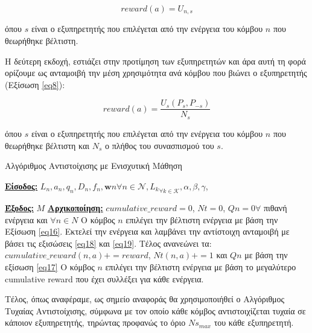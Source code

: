 \begin{equation}
    reward(a) = U_{n,s}
    \label{eq18}
\end{equation}

\noindent
όπου $s$ είναι ο εξυπηρετητής που επιλέγεται από την ενέργεια του κόμβου $n$ που θεωρήθηκε βέλτιστη.

Η δεύτερη εκδοχή, εστιάζει στην προτίμηση των εξυπηρετητών και άρα αυτή τη φορά ορίζουμε ως ανταμοιβή την μέση χρησιμότητα ανά κόμβου που βιώνει ο εξυπηρετητής (Εξίσωση \ref{eq8}):

\begin{equation}
    reward(a) = \frac{U_s(P_s,P_{-s})}{N_s}
    \label{eq19}
\end{equation}

\noindent
όπου $s$ είναι ο εξυπηρετητής που επιλέγεται από την ενέργεια του κόμβου $n$ που θεωρήθηκε βέλτιστη και $N_s$ ο πλήθος του συνασπισμού του $s$.

\newpage

\begin{algorithm}[h]
\caption{Αλγόριθμος Αντιστοίχισης με Ενισχυτική Μάθηση} \label{algorithm 3}
\begin{algorithmic}[1]
\STATE \textbf{\underline{Είσοδος:}} ${L_n, a_n, q_n, D_n, f_n, \mathbf{w}n}{\forall n\in \mathcal{N}}, {L_k}_{\forall k \in \mathcal{K}}, \alpha,\beta,\gamma$,

\STATE \textbf{\underline{Έξοδος:}}  $M$
\STATE \textbf{\underline{Αρχικοποίηση:}} $cumulative\_reward = 0$, $Nt = 0$, $Qn = 0 \forall$ πιθανή ενέργεια και $\forall n \in N$
\STATE Ο κόμβος $n$ επιλέγει την βέλτιστη ενέργεια με βάση την Εξίσωση \ref{eq16}.
\STATE Εκτελεί την ενέργεια και λαμβάνει την αντίστοιχη ανταμοιβή με βάσει τις εξισώσεις \ref{eq18} και \ref{eq19}.
\STATE Τέλος ανανεώνει τα: $cumulative\_reward(n,a) += reward$, $Nt(n,a) += 1$ και $Qn$ με βάση την εξίσωση \ref{eq17}
\ENDFOR
\ENDWHILE
{}
\STATE Ο κόμβος $n$ επιλέγει την βέλτιστη ενέργεια με βάση το μεγαλύτερο cumulative reward που έχει συλλέξει για κάθε ενέργεια.
\ENDFOR
\end{algorithmic}
\end{algorithm}
\vspace{-7pt}

Τέλος, όπως αναφέραμε, ως σημείο αναφοράς θα χρησιμοποιήθεί ο Αλγόριθμος Τυχαίας Αντιστοίχισης, σύμφωνα με τον οποίο κάθε κόμβος αντιστοιχίζεται τυχαία σε κάποιον εξυπηρετητής, τηρώντας προφανώς το όριο $Ns_{max}$ του κάθε εξυπηρετητή.

